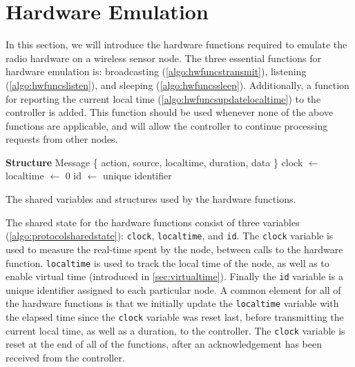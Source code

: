 \section{Hardware Emulation}\label{sec:mpiprotocol}
In this section, we will introduce the hardware functions required to emulate the radio hardware on a wireless sensor node. The three essential functions for hardware emulation is: broadcasting (\autoref{algo:hwfuncstransmit}), listening (\autoref{algo:hwfuncslisten}), and sleeping (\autoref{algo:hwfuncssleep}). Additionally, a function for reporting the current local time (\autoref{algo:hwfuncsupdatelocaltime}) to the controller is added. This function should be used whenever none of the above functions are applicable, and will allow the controller to continue processing requests from other nodes.





\begin{algorithm}[ht]
    \DontPrintSemicolon

    \textbf{Structure} Message \{ action, source, localtime, duration, data \}\;
    \;
    clock $\leftarrow$ \Now\;
    localtime $\leftarrow$ 0\;
    id $\leftarrow$ unique identifier\;
 
    \caption{The shared variables and structures used by the hardware functions.}
    \label{algo:protocolsharedstate}
\end{algorithm}


The shared state for the hardware functions consist of three variables (\autoref{algo:protocolsharedstate}): \texttt{clock}, \texttt{localtime}, and \texttt{id}. The \texttt{clock} variable is used to measure the real-time spent by the node, between calls to the hardware function. \texttt{localtime} is used to track the local time of the node, as well as to enable virtual time (introduced in \autoref{sec:virtualtime}). Finally the \texttt{id} variable is a unique identifier assigned to each particular node. A common element for all of the hardware functions is that we initially update the \texttt{localtime} variable with the elapsed time since the \texttt{clock} variable was reset last, before transmitting the current local time, as well as a duration, to the controller. The \texttt{clock} variable is reset at the end of all of the functions, after an acknowledgement has been received from the controller.\medbreak

